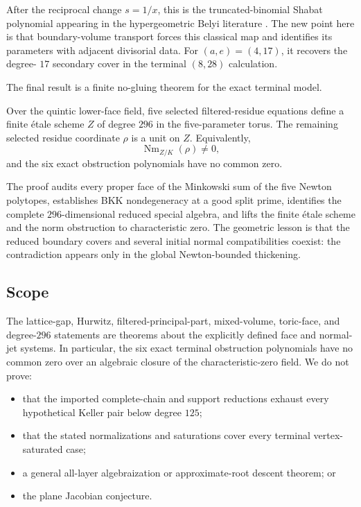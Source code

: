 \documentclass[11pt,reqno]{amsart}
\begin{document}
After the reciprocal change \(s=1/x\), this is the truncated-binomial
Shabat polynomial appearing in the hypergeometric Belyi literature
\cite{vidunas2025belyi}.  The new point here is that boundary-volume
transport forces this classical map and identifies its parameters with
adjacent divisorial data.  For \((a,e)=(4,17)\), it recovers the degree-
\(17\) secondary cover in the terminal \((8,28)\) calculation.

The final result is a finite no-gluing theorem for the exact terminal model.

\begin{theorem}
\label{thm:intro-degree-296}
Over the quintic lower-face field, five selected filtered-residue equations
define a finite \'{e}tale scheme \(Z\) of degree \(296\) in the five-parameter
torus.  The remaining selected residue coordinate \(\rho\) is a unit on
\(Z\).  Equivalently,
\[
 \operatorname{Nm}_{Z/K}(\rho)\ne0,
\]
and the six exact obstruction polynomials have no common zero.
\end{theorem}

The proof audits every proper face of the Minkowski sum of the five Newton
polytopes, establishes BKK nondegeneracy at a good split prime, identifies
the complete \(296\)-dimensional reduced special algebra, and lifts the
finite \'{e}tale scheme and the norm obstruction to characteristic zero.  The
geometric lesson is that the reduced boundary covers and several initial
normal compatibilities coexist: the contradiction appears only in the
global Newton-bounded thickening.

\subsection{Scope}

The lattice-gap, Hurwitz, filtered-principal-part, mixed-volume, toric-face,
and degree-\(296\) statements are theorems about the explicitly defined
face and normal-jet systems.  In particular, the six exact terminal
obstruction polynomials have no common zero over an algebraic closure of the characteristic-zero field.  We do not
prove:

\begin{itemize}
\item that the imported complete-chain and support reductions exhaust every
hypothetical Keller pair below degree \(125\);
\item that the stated normalizations and saturations cover every terminal
vertex-saturated case;
\item a general all-layer algebraization or approximate-root descent theorem;
or
\item the plane Jacobian conjecture.
\end{itemize}
\end{document}
